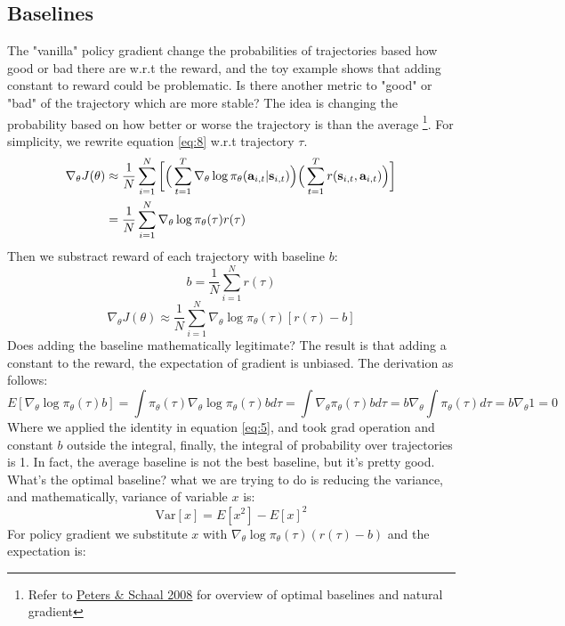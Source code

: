 \documentclass{tufte-handout}
\newcommand{\s}{\mathbf{s}}
\newcommand{\act}{\mathbf{a}}
\begin{document}
\subsection{Baselines}
The "vanilla" policy gradient change the probabilities of trajectories based how good or bad there are w.r.t the reward, and the toy example shows that adding constant to reward could be problematic. Is there another metric to "good" or "bad" of the trajectory which are more stable? The idea is changing the probability based on how better or worse the trajectory is than the average \thanks{Refer to \href{https://www.sciencedirect.com/science/article/pii/S0893608008000701}{\underline{Peters \& Schaal 2008}} for overview of optimal baselines and natural gradient}. For simplicity, we rewrite equation \ref{eq:8} w.r.t trajectory $\tau$.
\begin{align*}
\label{eq:20}
\nabla _\theta J(\theta)
 & \approx \frac{1}{N} \sum_{i=1} ^ {N} \bigg[\Big(\sum_{t=1}^T \nabla_\theta \log \pi_\theta(\act_{i,t} | \s_{i,t}) \Big)
  \Big( \sum_{t=1}^T r(\s_{i,t}, \act_{i,t}) \Big) \bigg] \notag \\
 & = \frac{1}{N} \sum_{i=1} ^ {N}\nabla_\theta \log \pi_\theta(\tau) r(\tau)
\end{align*}
Then we substract reward of each trajectory with baseline $b$:
\[
b = \frac{1}{N} \sum_{i=1} ^ N r(\tau)
\]
\begin{equation}
\label{eq:21}
 \nabla _\theta J(\theta) \approx \frac{1}{N} \sum_{i=1} ^ {N}\nabla_\theta \log \pi_\theta(\tau) [r(\tau) - b]
\end{equation}
Does adding the baseline mathematically legitimate? The result is that adding a constant to the reward, the expectation of gradient is unbiased.
The derivation as follows:
\begin{equation}
\label{eq:22}
E[\nabla_\theta \log \pi_\theta(\tau) b ] = \int \pi_\theta(\tau) \nabla_\theta \log \pi_\theta(\tau) b d\tau
 = \int \nabla_\theta \pi_\theta (\tau) b d \tau = b \nabla _\theta \int \pi_\theta (\tau) d \tau =  b \nabla_\theta 1 = 0
\end{equation}
Where we applied the identity in equation \ref{eq:5}, and took grad operation and constant $b$ outside the integral, finally, the integral of probability over trajectories is 1. In fact, the average baseline is not the best baseline, but it's pretty good. What's the optimal baseline? what we are trying to do is reducing the variance, and mathematically, variance of variable $x$ is:
\[
\text{Var}[x] = E[x^2] - E[x] ^2
\]
For policy gradient we substitute $x$ with $\nabla_\theta \log \pi_\theta(\tau) (r(\tau) - b)$ and the expectation is:
\end{document}
